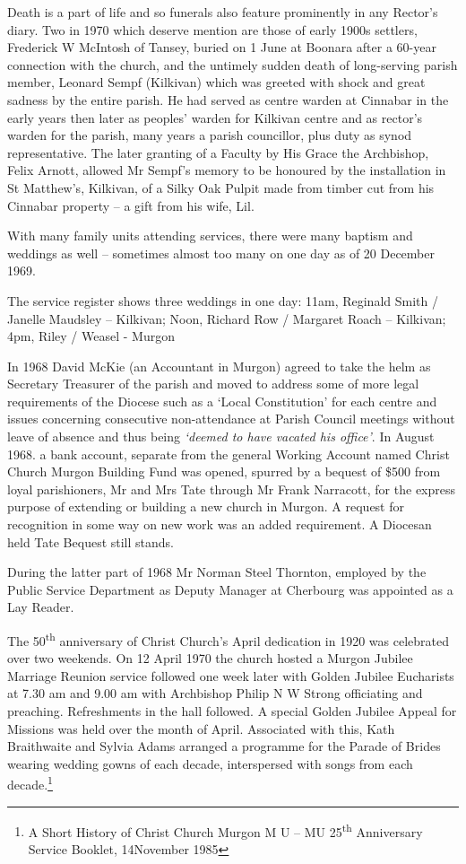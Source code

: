 Death is a part of life and so funerals also feature prominently in any Rector's diary. Two in 1970 which deserve mention are those of early 1900s settlers, Frederick W McIntosh of Tansey, buried on 1 June at Boonara after a 60-year connection with the church, and the untimely sudden death of long-serving parish member, Leonard Sempf (Kilkivan) which was greeted with shock and great sadness by the entire parish. He had served as centre warden at Cinnabar in the early years then later as peoples' warden for Kilkivan centre and as rector's warden for the parish, many years a parish councillor, plus duty as synod representative. The later granting of a Faculty by His Grace the Archbishop, Felix Arnott, allowed Mr Sempf's memory to be honoured by the installation in St Matthew's, Kilkivan, of a Silky Oak Pulpit made from timber cut from his Cinnabar property -- a gift from his wife, Lil.

With many family units attending services, there were many baptism and weddings as well -- sometimes almost too many on one day as of 20 December 1969.

The service register shows three weddings in one day: 11am, Reginald Smith / Janelle Maudsley -- Kilkivan; Noon, Richard Row / Margaret Roach -- Kilkivan; 4pm, Riley / Weasel - Murgon

In 1968 David McKie (an Accountant in Murgon) agreed to take the helm as Secretary Treasurer of the parish and moved to address some of more legal requirements of the Diocese such as a `Local Constitution' for each centre and issues concerning consecutive non-attendance at Parish Council meetings without leave of absence and thus being \emph{`deemed to have vacated his office'}. In August 1968. a bank account, separate from the general Working Account named Christ Church Murgon Building Fund was opened, spurred by a bequest of \$500 from loyal parishioners, Mr and Mrs Tate through Mr Frank Narracott, for the express purpose of extending or building a new church in Murgon. A request for recognition in some way on new work was an added requirement. A Diocesan held Tate Bequest still stands.

During the latter part of 1968 Mr Norman Steel Thornton, employed by the Public Service Department as Deputy Manager at Cherbourg was appointed as a Lay Reader.

The 50\textsuperscript{th} anniversary of Christ Church's April dedication in 1920 was celebrated over two weekends. On 12 April 1970 the church hosted a Murgon Jubilee Marriage Reunion service followed one week later with Golden Jubilee Eucharists at 7.30 am and 9.00 am with Archbishop Philip N W Strong officiating and preaching. Refreshments in the hall followed. A special Golden Jubilee Appeal for Missions was held over the month of April. Associated with this, Kath Braithwaite and Sylvia Adams arranged a programme for the Parade of Brides wearing wedding gowns of each decade, interspersed with songs from each decade.\footnote{A Short History of Christ Church Murgon M U -- MU 25\textsuperscript{th} Anniversary Service Booklet, 14November 1985}

